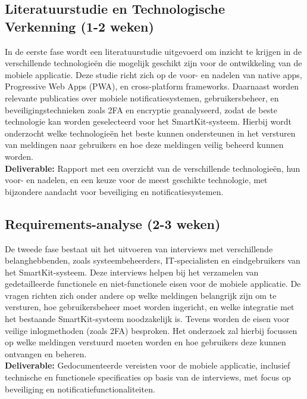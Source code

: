 \subsection{Literatuurstudie en Technologische \\Verkenning (1-2 weken)}
\noindent In de eerste fase wordt een literatuurstudie uitgevoerd om inzicht te krijgen in de verschillende technologieën die mogelijk geschikt zijn voor de ontwikkeling van de mobiele applicatie. Deze studie richt zich op de voor- en nadelen van native apps, Progressive Web Apps (PWA), en cross-platform frameworks. Daarnaast worden relevante publicaties over mobiele notificatiesystemen, gebruikersbeheer, en beveiligingstechnieken zoals 2FA en encryptie geanalyseerd, zodat de beste technologie kan worden geselecteerd voor het SmartKit-systeem. Hierbij wordt onderzocht welke technologieën het beste kunnen ondersteunen in het versturen van meldingen naar gebruikers en hoe deze meldingen veilig beheerd kunnen worden. \\

\noindent \textbf{Deliverable:} Rapport met een overzicht van de verschillende technologieën, hun voor- en nadelen, en een keuze voor de meest geschikte technologie, met bijzondere aandacht voor beveiliging en notificatiesystemen.

\subsection{Requirements-analyse (2-3 weken)}
\noindent De tweede fase bestaat uit het uitvoeren van interviews met verschillende belanghebbenden, zoals systeembeheerders, IT-specialisten en eindgebruikers van het SmartKit-systeem. Deze interviews helpen bij het verzamelen van gedetailleerde functionele en niet-functionele eisen voor de mobiele applicatie. De vragen richten zich onder andere op welke meldingen belangrijk zijn om te versturen, hoe gebruikersbeheer moet worden ingericht, en welke integratie met het bestaande SmartKit-systeem noodzakelijk is. Tevens worden de eisen voor veilige inlogmethoden (zoals 2FA) besproken. Het onderzoek zal hierbij focussen op welke meldingen verstuurd moeten worden en hoe gebruikers deze kunnen ontvangen en beheren. \\

\noindent \textbf{Deliverable:} Gedocumenteerde vereisten voor de mobiele applicatie, inclusief technische en functionele specificaties op basis van de interviews, met focus op beveiliging en notificatiefunctionaliteiten.

